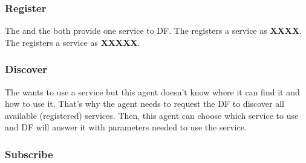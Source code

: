 \documentclass[a4paper,11pt]{article}
\begin{document}
  
  \subsubsection{Register}
  
  The \cu{} and the \to{} both provide one service to DF. The \cu{} registers a service as \textbf{XXXX}. %
  The \to{} registers a service as \textbf{XXXXX}. %
  
  \subsubsection{Discover}
  The \pa{} wants to use a service but this agent doesn't know where it can find it and how to use it. That's why the agent needs 
  to request the DF to discover all available (registered) services. Then, this agent can choose which service to use and DF will 
  answer it with parameters needed to use the service.
  
  \subsubsection{Subscribe} %
  
\end{document}
